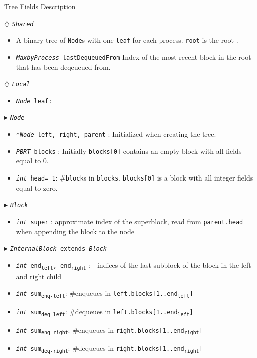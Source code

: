 \documentclass{article}
\newcommand{\sub}[1]{\textsubscript{#1}}
\renewcommand{\tt}[1]{\texttt{#1}}
\renewcommand{\sl}[1]{\textsl{#1}}
\newcommand{\nf}[1]{{\normalfont{\texttt{#1}}}}
\newcommand{\head}{head}
\theoremstyle{definition}
\begin{document}
\begin{algorithm}
\caption{Tree Fields Description}
\begin{algorithmic}[1]
\setcounter{ALG@line}{1}


\Statex $\diamondsuit$ \tt{\sl{Shared}}
\begin{itemize}
\item \textsf{A binary tree of \tt{Node}s with one \tt{leaf} for each process. \tt{root} is the root \nf{node}.}
\item {\color{red}\tt{\sl{MaxbyProcess} lastDequeuedFrom} \textsf{Index of the most recent block in the root that has been deqeueued from.}}
\end{itemize}

\Statex $\diamondsuit$ \tt{\sl{Local}}
\begin{itemize}
\item \tt{\sl{Node} leaf:} 
\end{itemize}

\Statex $\blacktriangleright$ \tt{\sl{Node}}
\begin{itemize}
\item \tt{\sl{*Node} left, right, parent} \textsf{: Initialized  when creating the tree.}
\item {\color{red}\tt{\sl{PBRT} blocks} \textsf{: Initially \tt{blocks[0]} contains an empty block with all fields equal to 0.}}
\item \tt{\sl{int} \head= 1}\textsf{: \#\tt{block}s in \tt{blocks}. \tt{blocks[0]} is a block with all integer fields equal to zero.}
\end{itemize}

\Statex $\blacktriangleright$ \tt{\sl{Block}} 

\begin{itemize}
  \item \tt{\sl{int} super}
  \textsf{: approximate index of the superblock, read from \tt{parent.head} when appending the block to the node}
\end{itemize}



\Statex $\blacktriangleright$ \tt{\sl{InternalBlock} extends \sl{Block}}
\begin{itemize}
    \item \tt{\sl{int} end\sub{left}, end\sub{right}}
  \textsf{:~~indices of the last subblock of the block in the left and right child}
  \item \tt{\sl{int} sum\sub{enq-left}}\textsf{: \#enqueues in \tt{left.blocks[1..end\sub{left}]}}
  \item \tt{\sl{int} sum\sub{deq-left}}\textsf{: \#dequeues in \tt{left.blocks[1..end\sub{left}]}}
  \item \tt{\sl{int} sum\sub{enq-right}}\textsf{: \#enqueues in \tt{right.blocks[1..end\sub{right}]}}
  \item \tt{\sl{int} sum\sub{deq-right}}\textsf{: \#dequeues in \tt{right.blocks[1..end\sub{right}]}}
\end{itemize}


\end{algorithmic}
\end{algorithm}
\end{document}
